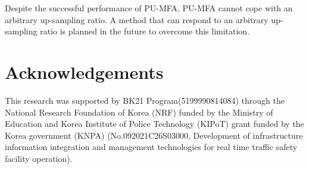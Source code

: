 \documentclass{article}
\begin{document}
\quad Despite the successful performance of PU-MFA, PU-MFA cannot cope with an arbitrary up-sampling ratio. A method that can respond to an arbitrary up-sampling ratio is planned in the future to overcome this limitation.

\section{Acknowledgements}
\quad This research was supported by BK21 Program(5199990814084) through the National Research Foundation of Korea (NRF) funded by the Ministry of Education and Korea Institute of Police Technology (KIPoT) grant funded by the Korea government (KNPA) (No.092021C26S03000, Development of infrastructure information integration and management technologies for real time traffic safety facility operation).

  
  
\end{document}
